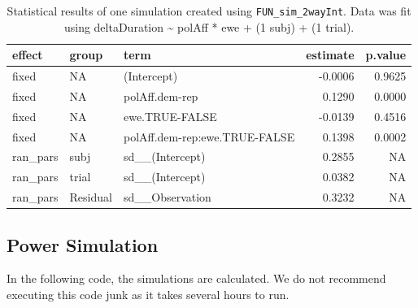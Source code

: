 \documentclass[
  letterpaper,
  DIV=11,
  numbers=noendperiod]{scrartcl}
\begin{document}
\label{tbl-demoFUNSim_2wayInt}
\begin{longtable}[]{@{}lllrr@{}}

\caption{\label{tbl-demoFUNSim_2wayInt}Statistical results of one
simulation created using \texttt{FUN\_sim\_2wayInt}. Data was fit using
deltaDuration \textasciitilde{} polAff * ewe + (1 \textbar{} subj) + (1
\textbar{} trial).}

\tabularnewline

\toprule\noalign{}
effect & group & term & estimate & p.value \\
\midrule\noalign{}
\endhead
\bottomrule\noalign{}
\endlastfoot
fixed & NA & (Intercept) & -0.0006 & 0.9625 \\
fixed & NA & polAff.dem-rep & 0.1290 & 0.0000 \\
fixed & NA & ewe.TRUE-FALSE & -0.0139 & 0.4516 \\
fixed & NA & polAff.dem-rep:ewe.TRUE-FALSE & 0.1398 & 0.0002 \\
ran\_pars & subj & sd\_\_(Intercept) & 0.2855 & NA \\
ran\_pars & trial & sd\_\_(Intercept) & 0.0382 & NA \\
ran\_pars & Residual & sd\_\_Observation & 0.3232 & NA \\

\end{longtable}

\subsection{Power Simulation}\label{power-simulation-1}

In the following code, the simulations are calculated. We do not
recommend executing this code junk as it takes several hours to run.
\end{document}
